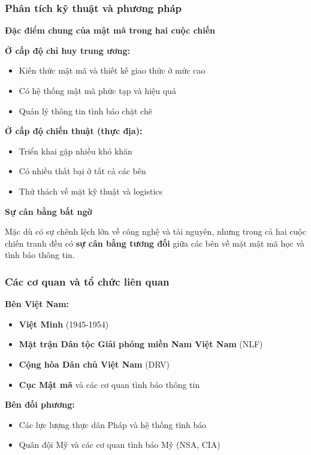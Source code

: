 \subsubsection{Phân tích kỹ thuật và phương pháp}

\textbf{Đặc điểm chung của mật mã trong hai cuộc chiến}

\textbf{Ở cấp độ chỉ huy trung ương:}
\begin{itemize}
\item Kiến thức mật mã và thiết kế giao thức ở mức cao
\item Có hệ thống mật mã phức tạp và hiệu quả
\item Quản lý thông tin tình báo chặt chẽ
\end{itemize}

\textbf{Ở cấp độ chiến thuật (thực địa):}
\begin{itemize}
\item Triển khai gặp nhiều khó khăn
\item Có nhiều thất bại ở tất cả các bên
\item Thử thách về mặt kỹ thuật và logistics
\end{itemize}

\textbf{Sự cân bằng bất ngờ}

Mặc dù có sự chênh lệch lớn về công nghệ và tài nguyên, nhưng trong cả hai cuộc chiến tranh đều có \textbf{sự cân bằng tương đối} giữa các bên về mặt mật mã học và tình báo thông tin.

\subsubsection{Các cơ quan và tổ chức liên quan}

\textbf{Bên Việt Nam:}
\begin{itemize}
\item \textbf{Việt Minh} (1945-1954)
\item \textbf{Mặt trận Dân tộc Giải phóng miền Nam Việt Nam} (NLF)
\item \textbf{Cộng hòa Dân chủ Việt Nam} (DRV)
\item \textbf{Cục Mật mã} và các cơ quan tình báo thông tin
\end{itemize}

\textbf{Bên đối phương:}
\begin{itemize}
\item Các lực lượng thực dân Pháp và hệ thống tình báo
\item Quân đội Mỹ và các cơ quan tình báo Mỹ (NSA, CIA)
\end{itemize}

